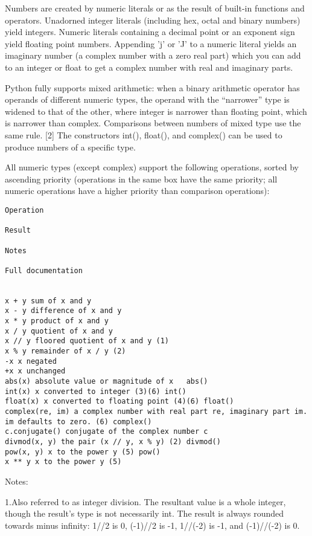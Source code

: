 Numbers are created by numeric literals or as the result of built-in functions and operators. Unadorned integer literals (including hex, octal and binary numbers) yield integers. Numeric literals containing a decimal point or an exponent sign yield floating point numbers. Appending 'j' or 'J' to a numeric literal yields an imaginary number (a complex number with a zero real part) which you can add to an integer or float to get a complex number with real and imaginary parts.

Python fully supports mixed arithmetic: when a binary arithmetic operator has operands of different numeric types, the operand with the “narrower” type is widened to that of the other, where integer is narrower than floating point, which is narrower than complex. Comparisons between numbers of mixed type use the same rule. [2] The constructors int(), float(), and complex() can be used to produce numbers of a specific type.

All numeric types (except complex) support the following operations, sorted by ascending priority (operations in the same box have the same priority; all numeric operations have a higher priority than comparison operations):






\begin{lstlisting}
Operation

Result

Notes

Full documentation


x + y sum of x and y     
x - y difference of x and y     
x * y product of x and y     
x / y quotient of x and y     
x // y floored quotient of x and y (1)   
x % y remainder of x / y (2)   
-x x negated     
+x x unchanged     
abs(x) absolute value or magnitude of x   abs() 
int(x) x converted to integer (3)(6) int() 
float(x) x converted to floating point (4)(6) float() 
complex(re, im) a complex number with real part re, imaginary part im. im defaults to zero. (6) complex() 
c.conjugate() conjugate of the complex number c     
divmod(x, y) the pair (x // y, x % y) (2) divmod() 
pow(x, y) x to the power y (5) pow() 
x ** y x to the power y (5)   
\end{lstlisting}


Notes:

1.Also referred to as integer division. The resultant value is a whole integer, though the result’s type is not necessarily int. The result is always rounded towards minus infinity: 1//2 is 0, (-1)//2 is -1, 1//(-2) is -1, and (-1)//(-2) is 0.


